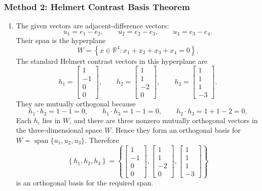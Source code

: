 \documentclass[12pt]{article}
\newcommand{\R}{\mathbb{R}}
\newcommand{\Span}{\operatorname{span}}
\begin{document}
\newpage
\subsubsection{Method 2: Helmert Contrast Basis Theorem}
\begin{enumerate}[label=(\alph*)]
  \item The given vectors are adjacent-difference vectors:
  \[
  u_1=e_1-e_2,
  \qquad
  u_2=e_2-e_3,
  \qquad
  u_3=e_3-e_4.
  \]
  Their span is the hyperplane
  \[
  W=\left\{x\in\R^4:x_1+x_2+x_3+x_4=0\right\}.
  \]
  The standard Helmert contrast vectors in this hyperplane are
  \[
  h_1=\begin{bmatrix}1\\-1\\0\\0\end{bmatrix},
  \qquad
  h_2=\begin{bmatrix}1\\1\\-2\\0\end{bmatrix},
  \qquad
  h_3=\begin{bmatrix}1\\1\\1\\-3\end{bmatrix}.
  \]
  They are mutually orthogonal because
  \[
  h_1\cdot h_2=1-1=0,
  \qquad
  h_1\cdot h_3=1-1=0,
  \qquad
  h_2\cdot h_3=1+1-2=0.
  \]
  Each $h_i$ lies in $W$, and there are three nonzero mutually orthogonal vectors in the three-dimensional space $W$. Hence they form an orthogonal basis for $W=\Span\{u_1,u_2,u_3\}$. Therefore
  \[
  \boxed{\left\{h_1,h_2,h_3\right\}
  =
  \left\{
  \begin{bmatrix}1\\-1\\0\\0\end{bmatrix},
  \begin{bmatrix}1\\1\\-2\\0\end{bmatrix},
  \begin{bmatrix}1\\1\\1\\-3\end{bmatrix}
  \right\}}
  \]
  is an orthogonal basis for the required span.


\end{enumerate}
\end{document}
